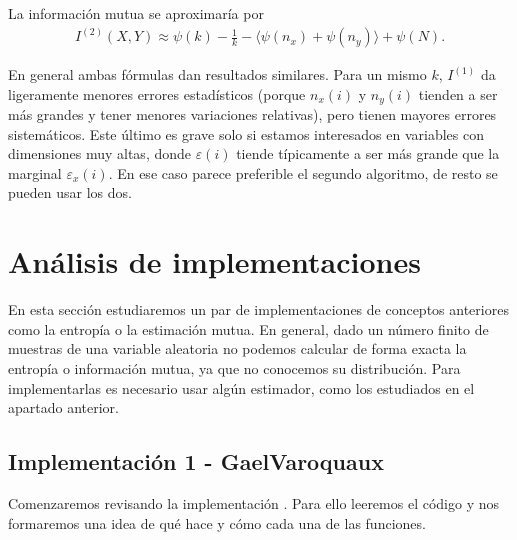 \documentclass[10pt,a4paper]{article} %
\theoremstyle{definition}
\begin{document}
La información mutua se aproximaría por
\begin{align}
I^{(2)}(X,Y) \approx \psi(k) - \frac{1}{k} - \langle \psi(n_x) + \psi(n_y) \rangle + \psi(N). \label{eq:est2}
\end{align}


En general ambas fórmulas dan resultados similares. Para un mismo $k$, $I^{(1)}$ da ligeramente menores errores estadísticos (porque $n_x(i)$ y $n_y(i)$ tienden a ser más grandes y tener menores variaciones relativas), pero tienen mayores errores sistemáticos. Este último es grave solo si estamos interesados en variables con dimensiones muy altas, donde $\varepsilon(i)$ tiende típicamente a ser más grande que la marginal $\varepsilon_x(i)$. En ese caso parece preferible el segundo algoritmo, de resto se pueden usar los dos.

\section{Análisis de implementaciones}

En esta sección estudiaremos un par de implementaciones de conceptos anteriores como la entropía o la estimación mutua. En general, dado un número finito de muestras de una variable aleatoria no podemos calcular de forma exacta la entropía o información mutua, ya que no conocemos su distribución. Para implementarlas es necesario usar algún estimador, como los estudiados en el apartado anterior.

\subsection{Implementación 1 - GaelVaroquaux}

Comenzaremos revisando la implementación \cite{estimating}. Para ello leeremos el código y nos formaremos una idea de qué hace y cómo cada una de las funciones.
\end{document}
